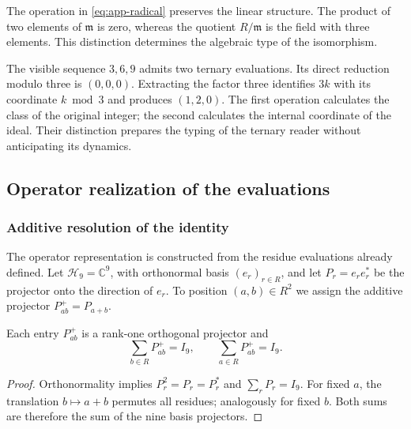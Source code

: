 The operation in \eqref{eq:app-radical} preserves the linear structure. The product of two elements of $\mathfrak m$ is zero, whereas the quotient $R/\mathfrak m$ is the field with three elements. This distinction determines the algebraic type of the isomorphism.

The visible sequence $3,6,9$ admits two ternary evaluations. Its direct reduction modulo three is $(0,0,0)$. Extracting the factor three identifies $3k$ with its coordinate $k\bmod3$ and produces $(1,2,0)$. The first operation calculates the class of the original integer; the second calculates the internal coordinate of the ideal. Their distinction prepares the typing of the ternary reader without anticipating its dynamics.

\subsection{Operator realization of the evaluations}
\label{sec:app-operadores}

\subsubsection{Additive resolution of the identity}

The operator representation is constructed from the residue evaluations already defined. Let $\mathcal H_9=\mathbb C^9$, with orthonormal basis $(e_r)_{r\in R}$, and let $P_r=e_re_r^*$ be the projector onto the direction of $e_r$. To position $(a,b)\in R^2$ we assign the additive projector $P^+_{ab}=P_{a+b}$.

\begin{bloqueindivisible}
\begin{proposicion}
\label{prop:app-aditivo-operador}
Each entry $P^+_{ab}$ is a rank-one orthogonal projector and
\begin{equation}
 \sum_{b\in R}P^+_{ab}=I_9,
 \qquad \sum_{a\in R}P^+_{ab}=I_9.
\end{equation}
\end{proposicion}

\begin{proof}
Orthonormality implies $P_r^2=P_r=P_r^*$ and $\sum_rP_r=I_9$. For fixed $a$, the translation $b\mapsto a+b$ permutes all residues; analogously for fixed $b$. Both sums are therefore the sum of the nine basis projectors.
\end{proof}
\end{bloqueindivisible}

